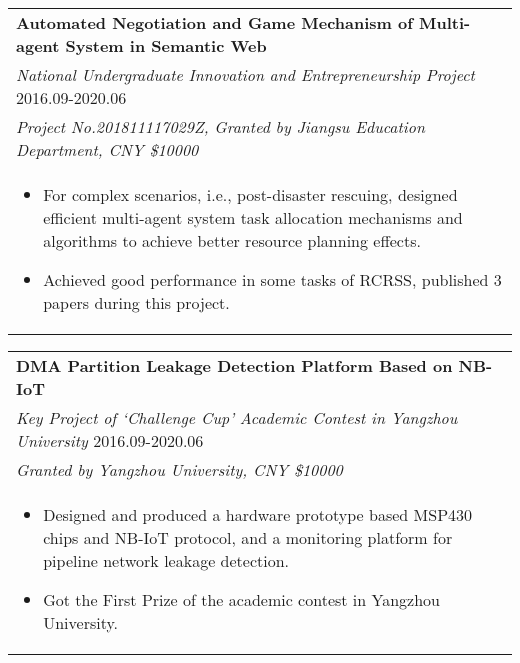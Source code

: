 \documentclass{resume}
\begin{document}
\begin{tabular*}{16.2cm}{l@{\extracolsep{\fill}}}
  \textbf{Automated Negotiation and Game Mechanism of Multi-agent System in Semantic Web}\\
  \emph{National Undergraduate Innovation and Entrepreneurship Project} \hfill 2016.09-2020.06\\
  \emph{Project No.201811117029Z, Granted by Jiangsu Education Department, CNY \$10000}\\
  \multicolumn{1}{p{16.2cm}}{
    \vspace{-0.15cm}  
  \begin{itemize}
      \item For complex scenarios, i.e., post-disaster rescuing, designed efficient multi-agent system task allocation mechanisms and algorithms to achieve better resource planning effects.
      \item Achieved good performance in some tasks of RCRSS, published 3 papers during this project.
      \end{itemize}}
  \end{tabular*}

  \vspace{-0.5cm}
\begin{tabular*}{16.2cm}{l@{\extracolsep{\fill}}}
\textbf{DMA Partition Leakage Detection Platform Based on NB-IoT} \\
\emph{Key Project of `Challenge Cup' Academic Contest in Yangzhou University} \hfill 2016.09-2020.06\\
\emph{Granted by Yangzhou University, CNY \$10000}\\
\multicolumn{1}{p{16.4cm}}{
  \vspace{-0.15cm}  
\begin{itemize}
    \item Designed and produced a hardware prototype based MSP430 chips and NB-IoT protocol, and a monitoring platform for pipeline network leakage detection.
    \item Got the First Prize of the academic contest in Yangzhou University.
    \end{itemize}}
\end{tabular*}

\vspace{-0.4cm} 

\end{document}
